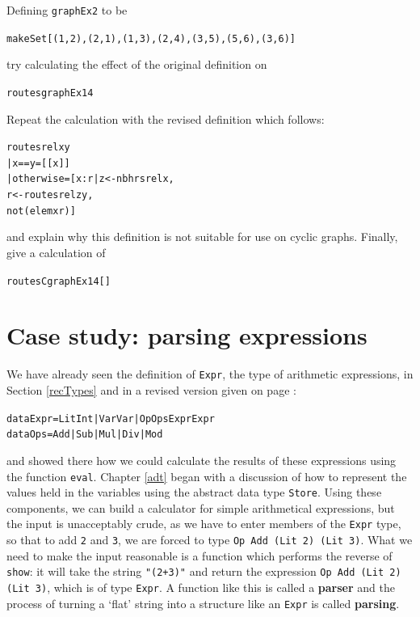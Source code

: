 \begin{exerciseone}
\item
Defining \texttt{graphEx2} to be
\begin{alltt} 
makeSet [(1,2),(2,1),(1,3),(2,4),(3,5),(5,6),(3,6)]
\end{alltt}
try calculating
the effect of the original definition on  
\begin{alltt}
routes graphEx 1 4
\end{alltt}
Repeat the calculation with the revised definition which follows:
\begin{alltt}
routes rel x y
  | x==y        = [[x]]   
  | otherwise   = [ x:r | z <- nbhrs rel x ,
                          r <- routes rel z y ,
                          not (elem x r) ]
\end{alltt}
and explain why this definition is not suitable for use on cyclic graphs.
Finally, give a calculation of 
\begin{alltt}
routesC graphEx 1 4 []
\end{alltt}
\end{exerciseone}


\section{Case study: parsing expressions}
\label{parsing}

We have already seen the definition of \texttt{Expr}, the type of arithmetic
expressions, in Section \ref{recTypes} and in a 
revised version given on page \pageref{modExpr}:
\begin{alltt}
data Expr = Lit Int | Var Var | Op Ops Expr Expr
data Ops  = Add | Sub | Mul | Div | Mod
\end{alltt}
and showed there how we could calculate
the results of these expressions using the function \texttt{eval}. Chapter
\ref{adt} began with a discussion of how to represent the values held in the
variables using the abstract data type \texttt{Store}. Using these components, we
can build a calculator for simple arithmetical expressions, but the
input is unacceptably crude, as we have to enter members of the \texttt{Expr}
type, so that to add \texttt{2} and \texttt{3}, we are forced to type
\texttt{Op Add (Lit 2) (Lit 3)}. %
What we need to make the input reasonable is a function which performs the
reverse of \texttt{show}: it will take the string \texttt{"(2+3)"} and return the
expression \texttt{Op Add (Lit 2) (Lit 3)}, which is of type \texttt{Expr}. A function like this is called a \textbf{parser} and the process of turning a `flat' string into a structure like an \texttt{Expr} is called \textbf{parsing}.

